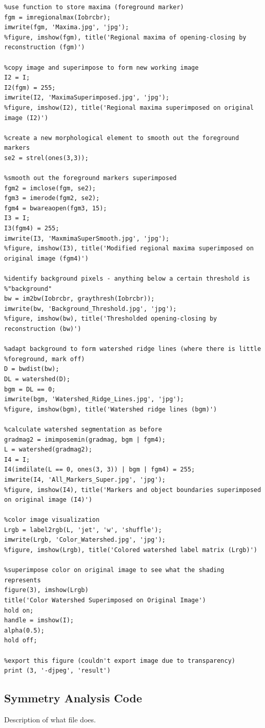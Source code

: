 \documentclass[12pt]{article}
\theoremstyle{plain}%
\theoremstyle{definition}
\theoremstyle{remark}
\begin{document}
\begin{verbatim}
%use function to store maxima (foreground marker)
fgm = imregionalmax(Iobrcbr);
imwrite(fgm, 'Maxima.jpg', 'jpg');
%figure, imshow(fgm), title('Regional maxima of opening-closing by reconstruction (fgm)')

%copy image and superimpose to form new working image
I2 = I;
I2(fgm) = 255;
imwrite(I2, 'MaximaSuperimposed.jpg', 'jpg');
%figure, imshow(I2), title('Regional maxima superimposed on original image (I2)')

%create a new morphological element to smooth out the foreground markers
se2 = strel(ones(3,3));

%smooth out the foreground markers superimposed
fgm2 = imclose(fgm, se2);
fgm3 = imerode(fgm2, se2);
fgm4 = bwareaopen(fgm3, 15);
I3 = I;
I3(fgm4) = 255;
imwrite(I3, 'MaxmimaSuperSmooth.jpg', 'jpg');
%figure, imshow(I3), title('Modified regional maxima superimposed on original image (fgm4)')

%identify background pixels - anything below a certain threshold is
%"background"
bw = im2bw(Iobrcbr, graythresh(Iobrcbr));
imwrite(bw, 'Background_Threshold.jpg', 'jpg');
%figure, imshow(bw), title('Thresholded opening-closing by reconstruction (bw)')

%adapt background to form watershed ridge lines (where there is little
%foreground, mark off)
D = bwdist(bw);
DL = watershed(D);
bgm = DL == 0;
imwrite(bgm, 'Watershed_Ridge_Lines.jpg', 'jpg');
%figure, imshow(bgm), title('Watershed ridge lines (bgm)')

%calculate watershed segmentation as before
gradmag2 = imimposemin(gradmag, bgm | fgm4);
L = watershed(gradmag2);
I4 = I;
I4(imdilate(L == 0, ones(3, 3)) | bgm | fgm4) = 255;
imwrite(I4, 'All_Markers_Super.jpg', 'jpg');
%figure, imshow(I4), title('Markers and object boundaries superimposed on original image (I4)')

%color image visualization
Lrgb = label2rgb(L, 'jet', 'w', 'shuffle');
imwrite(Lrgb, 'Color_Watershed.jpg', 'jpg');
%figure, imshow(Lrgb), title('Colored watershed label matrix (Lrgb)')

%superimpose color on original image to see what the shading represents
figure(3), imshow(Lrgb)
title('Color Watershed Superimposed on Original Image')
hold on;
handle = imshow(I);
alpha(0.5);
hold off;

%export this figure (couldn't export image due to transparency)
print (3, '-djpeg', 'result')
\end{verbatim}

\subsection{Symmetry Analysis Code}
Description of what file does.
\end{document}
